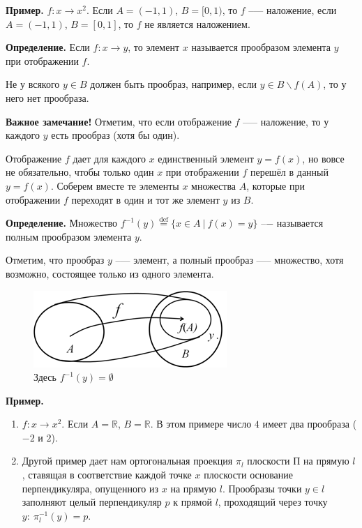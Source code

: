 \documentclass{article}
\begin{document}
    \textbf{Пример.} $f: x \rightarrow x^2$. Если $A = (-1, 1)$, $B = [0, 1)$, то $f$ --— наложение, если $A = (-1, 1)$, $B = [0, 1]$, то $f$ не является наложением.

    \textbf{Определение.} Если $f: x \rightarrow y$, то элемент $x$ называется прообразом элемента $y$ при отображении $f$.

    Не у всякого $y \in B$ должен быть прообраз, например, если $y \in B \backslash f(A)$, то у него нет прообраза.

    \textbf{Важное замечание!} Отметим, что если отображение $f$ --— наложение, то у каждого $y$ есть прообраз (хотя бы один).

    Отображение $f$ дает для каждого $x$ единственный элемент $y = f(x)$, но вовсе не обязательно, чтобы только один $x$ при отображении $f$ перешёл в данный $y = f(x)$. Соберем вместе те элементы $x$ множества $A$, которые при отображении $f$ переходят в один и тот же элемент $y$ из $B$.

    \textbf{Определение.} Множество $f^{-1}(y) \overset{\mathrm{def}}{=} \{x \in A\ |\ f(x) = y\}$ --− называется полным прообразом элемента $y$.

    Отметим, что прообраз $y$ --— элемент, а полный прообраз —-- множество, хотя возможно, состоящее только из одного элемента.

    \begin{figure}[h!]
    \centering
    \includegraphics[scale=0.75]{2}
    \caption{\label{fig:fig2}Здесь $f^{-1}(y) = \emptyset$}
    \end{figure}

    \textbf{Пример.}
    
    \begin{enumerate}
        \item $f: x \rightarrow x^2$. Если $A = \mathbb{R}$, $B = \mathbb{R}$. В этом примере число $4$ имеет два прообраза ($-2$ и $2$).
        \item Другой пример дает нам ортогональная проекция $\pi_l$ плоскости $\textrm{П}$ на прямую $l$, ставящая в соответствие каждой точке $x$ плоскости основание перпендикуляра, опущенного из $x$ на прямую $l$. Прообразы точки $y \in l$ заполняют целый перпендикуляр $p$ к прямой $l$, проходящий через точку $y:\ \pi_l^{-1}(y) = p$.
    \end{enumerate}
\end{document}
